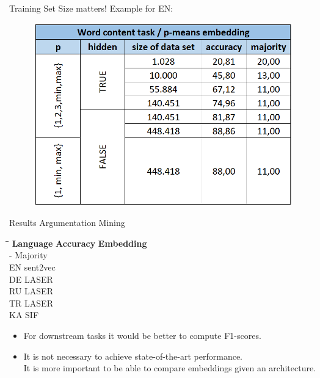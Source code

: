 \documentclass[accentcolor=tud1a,colorbacktitle,inverttitle,landscape,german,presentation,t]{tudbeamer}
\begin{document}
\begin{frame}{Training Set Size matters!}{}
	\vspace*{-4mm}
	Example for EN:
	\begin{figure}
		\centering
		\includegraphics[scale=0.35]{images/effect_training_set_size}
	\end{figure}
\end{frame}


\begin{frame}{Results Argumentation Mining}{}
	\vspace*{-8mm}
	\begin{center}\parbox{0cm}{\begin{tabbing}
		\hspace*{3.5cm}\=\hspace*{4.5cm}\=\kill
		\textbf{Language} 	\>
		\textbf{Accuracy} 	\>
		\textbf{Embedding}	\\[3mm]
		-		 	\> 	Majority		\\[1mm]
		EN			\>	sent2vec 	\\[1mm]
		DE		 	\>	LASER 		\\[1mm]
		RU			\> 	LASER 		\\[1mm]
		TR			\>	LASER 		\\[1mm]
		KA			\>	SIF
	\end{tabbing}}
	\end{center}

	\begin{itemize}\setlength\itemsep{1em}
		\item For downstream tasks it would be better to compute F1-scores.
		\item It is not necessary to achieve state-of-the-art performance. \\
			It is more important to be able to compare embeddings given an architecture.
	\end{itemize}
\end{frame}
\end{document}
